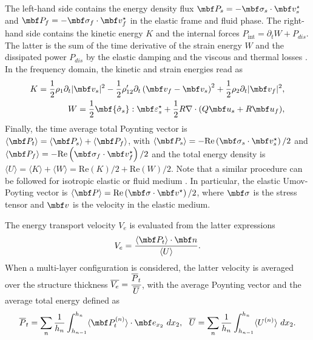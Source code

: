 The left-hand side contains the energy density flux $\mbf P_s=-  \mbf \sigma_s \cdot \mbf v_s^\star$ and $\mbf P_f=-  \mbf \sigma_f \cdot \mbf v_f^\star$ in the elastic frame and fluid phase. The right-hand side contains the kinetic energy $K$ \cite{allard2009} and the internal forces $P_{\text{int}}=\partial_t W+P_{dis}$. The latter is the sum of the time derivative of the strain energy $W$ and the dissipated power $P_{dis}$ by the elastic damping and the viscous and thermal losses \cite{dazel2008}. In the frequency domain, the kinetic and strain energies read as
   \begin{equation}
        \begin{aligned}
            K = \frac 1 2 \rho_1  \partial_t |\mbf v_s|^2 - \frac 1 2 \rho_{12}' \partial_t\left(\mbf v_f - \mbf v_s \right)^2 +  \frac 1 2\rho_2 \partial_t|\mbf v_f|^2, \\
            W = \frac 1 2 \mbf{\hat \sigma_s}: \mbf \varepsilon_s^\star + \frac 1 2 R \nabla \cdot ( Q  \mbf u_s + R \mbf u_f ),
        \end{aligned}
    \end{equation}
Finally, the time average total Poynting vector is $\langle \mbf P_t \rangle=\langle \mbf P_s \rangle+\langle \mbf P_f\rangle$, with $\langle \mbf P_s \rangle=-  \textrm{Re}\left(\mbf \sigma_s \cdot \mbf v_s^\star\right)/2 $ and $\langle \mbf P_f\rangle =-  \textrm{Re}\left(\mbf \sigma_f \cdot \mbf v_f^\star \right)/2$ and the total energy density is $\langle U \rangle = \langle K \rangle+\langle W \rangle =  \text{Re}(K)/2 + \text{Re} (W)/2$. Note that a similar procedure can be followed for isotropic elastic or fluid medium \cite{royer2021}. In particular,  the elastic Umov-Poyting vector is $\langle \mbf P \rangle=\textrm{Re}\left(\mbf \sigma \cdot \mbf v^\star\right)/2$, where $\mbf \sigma$ is the stress tensor and $\mbf v$ is the velocity in the elastic medium. 

The energy transport velocity $V_e$ is evaluated from the latter expressions
\begin{equation}
    V_e = \frac{\langle \mbf P_t \rangle \cdot \mbf n}{ \langle U \rangle}.
\end{equation}
When a multi-layer configuration is considered, the latter velocity is averaged over the structure thickness $\overline{V_e} = \cfrac {\overline{P}_t} {\overline U}$, with the average Poynting vector and the average total energy defined as
\begin{equation}
    \overline{P}_t = \sum_n \frac{1}{h_n} \int_{h_{n-1}}^{h_n} \langle\mbf P_t^{(n)} \rangle\cdot \mbf e_{x_2} ~dx_2, ~~
    \overline U = \sum_n \frac{1}{h_n} \int_{h_{n-1}}^{h_n} \langle U^{(n)} \rangle  ~dx_2.
    \label{eq:mean_energy}
\end{equation}

\printbibliography[heading=subbibnumbered]
% 